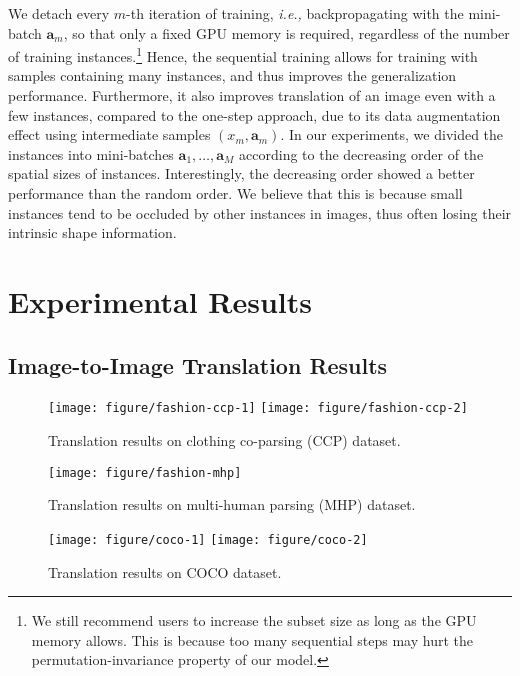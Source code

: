 \documentclass{article} \usepackage{iclr2019_conference,times}
\begin{document}
We detach every $m$-th iteration of training,
\textit{i.e.,} backpropagating with the mini-batch $\bm{a}_m$,
so that only a fixed GPU memory is required, regardless of the number of training instances.\footnote{
We still recommend users to increase the subset size as long as the GPU memory allows.
This is because too many sequential steps may hurt the permutation-invariance property of our model.}
Hence, the sequential training allows for training with samples containing many instances,
and thus improves the generalization performance.
Furthermore, it also improves translation of an image even with a few instances, compared to the one-step approach, due to its data augmentation effect using intermediate samples $(x_m, \bm{a}_m)$.
In our experiments, we divided the instances into mini-batches $\bm{a}_1, \dots, \bm{a}_M$ 
according to the decreasing order of the spatial sizes of instances.
Interestingly, the decreasing order showed a better performance than the random order.
We believe that this is because small instances tend to be occluded by other instances in images, thus often losing their intrinsic shape information. 

%
 \vspace{-0.05in}
\section{Experimental Results}
\vspace{-0.05in}
\label{sec:exp}

\vspace{-0.025in}
\subsection{Image-to-Image Translation Results}
\label{sec:exp-qualitative}
\vspace{-0.025in}

\begin{figure}[t]
    \vspace{-0.2in}
	\centering
	\texttt{[image: figure/fashion-ccp-1]}
	\texttt{[image: figure/fashion-ccp-2]}
	\caption{
	Translation results on clothing co-parsing (CCP) \citep{yang2014clothing} dataset.
	} \label{fig:fashion-ccp}
    \vspace{0.05in}
	\texttt{[image: figure/fashion-mhp]}
	\caption{
	Translation results on multi-human parsing (MHP) \citep{zhao2018understanding} dataset.
	} \label{fig:fashion-mhp}	
    \vspace{0.05in}
	\texttt{[image: figure/coco-1]}
	\texttt{[image: figure/coco-2]}
	\caption{
	Translation results on COCO \citep{lin2014microsoft} dataset.
	} \label{fig:coco}
	\vspace{-0.1in}
\end{figure}
\end{document}

